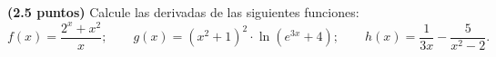 
\textbf{(2.5 puntos)} Calcule las derivadas de las siguientes funciones:
\[
f(x)=\frac{2^x+x^2}{x};\qquad
g(x)=(x^2+1)^2\cdot\ln(e^{3x}+4);\qquad
h(x)=\frac{1}{3x}-\frac{5}{x^2-2}.
\]

